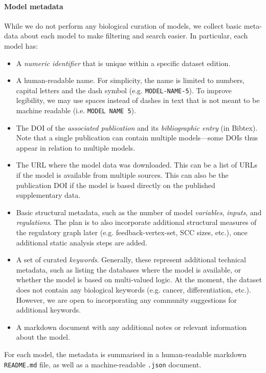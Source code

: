 \documentclass{article}
\begin{document}
\paragraph{Model metadata} While we do not perform any biological curation of models, we collect basic meta-data about each model to make filtering and search easier. In particular, each model has:
\begin{itemize}
	\item A \emph{numeric identifier} that is unique within a specific dataset edition.
	\item A human-readable name. For simplicity, the name is limited to numbers, capital letters and the dash symbol (e.g. \texttt{MODEL-NAME-5}). To improve legibility, we may use spaces instead of dashes in text that is not meant to be machine readable (i.e. \texttt{MODEL NAME 5}).
	\item The DOI of the \emph{associated publication} and its \emph{bibliographic entry} (in Bibtex). Note that a single publication can contain multiple models---some DOIs thus appear in relation to multiple models.
	\item The URL where the model data was downloaded. This can be a list of URLs if the model is available from multiple sources. This can also be the publication DOI if the model is based directly on the published supplementary data.
	\item Basic structural metadata, such as the number of model \emph{variables}, \emph{inputs}, and \emph{regulations}. The plan is to also incorporate additional structural measures of the regulatory graph later (e.g. feedback-vertex-set, SCC sizes, etc.), once additional static analysis steps are added.
	\item A set of curated \emph{keywords}. Generally, these represent additional technical metadata, such as listing the databases where the model is available, or whether the model is based on multi-valued logic. At the moment, the dataset does not contain any biological keywords (e.g. cancer, differentiation, etc.). However, we are open to incorporating any community suggestions for additional keywords.
	\item A markdown document with any additional notes or relevant information about the model.
\end{itemize}

For each model, the metadata is summarised in a human-readable markdown \texttt{README.md} file, as well as a machine-readable \texttt{.json} document.
\end{document}
